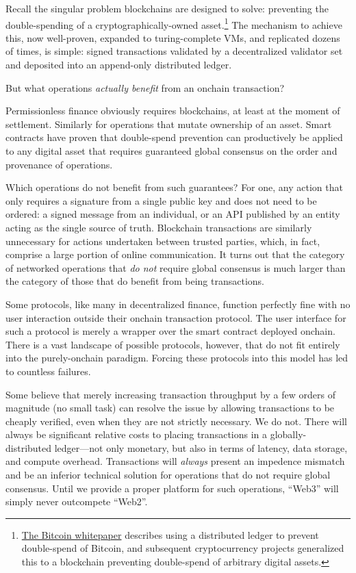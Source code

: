 \documentclass[runningheads]{llncs}
\begin{document}
Recall the singular problem blockchains are designed to solve: preventing the double-spending of a cryptographically-owned asset.\footnote{\href{https://bitcoin.org/bitcoin.pdf}{The Bitcoin whitepaper} describes using a distributed ledger to prevent double-spend of Bitcoin, and subsequent cryptocurrency projects generalized this to a blockchain preventing double-spend of arbitrary digital assets.}
The mechanism to achieve this, now well-proven, expanded to turing-complete VMs, and replicated dozens of times, is simple: signed transactions validated by a decentralized validator set and deposited into an append-only distributed ledger.

But what operations \textit{actually benefit} from an onchain transaction?

Permissionless finance obviously requires blockchains, at least at the moment of settlement.
Similarly for operations that mutate ownership of an asset.
Smart contracts have proven that double-spend prevention can productively be applied to any digital asset that requires guaranteed global consensus on the order and provenance of operations.

Which operations do not benefit from such guarantees?
For one, any action that only requires a signature from a single public key and does not need to be ordered:
a signed message from an individual, or an API published by an entity acting as the single source of truth.
Blockchain transactions are similarly unnecessary for actions undertaken between trusted parties, which, in fact, comprise a large portion of online communication.
It turns out that the category of networked operations that \textit{do not} require global consensus is much larger than the category of those that do benefit from being transactions.

Some protocols, like many in decentralized finance, function perfectly fine with no user interaction outside their onchain transaction protocol.
The user interface for such a protocol is merely a wrapper over the smart contract deployed onchain.
There is a vast landscape of possible protocols, however, that do not fit entirely into the purely-onchain paradigm.
Forcing these protocols into this model has led to countless failures.

Some believe that merely increasing transaction throughput by a few orders of magnitude (no small task) can resolve the issue by allowing transactions to be cheaply verified, even when they are not strictly necessary.
We do not.
There will always be significant relative costs to placing transactions in a globally-distributed ledger—not only monetary, but also in terms of latency, data storage, and compute overhead.
Transactions will \textit{always} present an impedence mismatch and be an inferior technical solution for operations that do not require global consensus.
Until we provide a proper platform for such operations, ``Web3'' will simply never outcompete ``Web2''.
\end{document}
